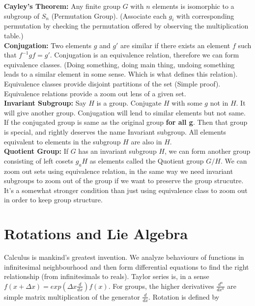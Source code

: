 \documentclass{report}
\begin{document}
\noindent\textbf{Cayley's Theorem:} Any finite group $G$ with $n$ elements is isomorphic to a subgroup of $S_n$ (Permutation Group). (Associate each $g_i$ with corresponding permutation by checking the permutation offered by observing the multiplication table.)\\

\noindent\textbf{Conjugation:} Two elements $g$ and $g'$ are similar if there exists an element $f$ such that $f^{-1}gf = g'$. Conjugation is an equivalence relation, therefore we can form equivalence classes. (Doing something, doing main thing, undoing something leads to a similar element in some sense. Which is what defines this relation). Equivalence classes provide disjoint partitions of the set (Simple proof). Equivalence relations provide a zoom out lens of a given set.\\

\noindent\textbf{Invariant Subgroup:} Say $H$ is a group. Conjugate $H$ with some $g$ not in $H$. It will give another group. Conjugation will lend to similar elements but not same. If the conjugated group is same as the original group \textbf{for all g}. Then that group is special, and rightly deserves the name Invariant subgroup. All elements equivalent to elements in the subgroup $H$ are also in $H$.\\

\noindent\textbf{Quotient Group:} If $G$ has an invariant subgroup $H$, we can form another group consisting of left cosets $g_aH$ as elements called the Quotient group $G/H$. We can zoom out sets using equivalence relation, in the same way we need invariant subgroups to zoom out of the group if we want to preserve the group strucutre. It's a somewhat stronger condition than just using equivalence class to zoom out in order to keep group structure. \\

\section{Rotations and Lie Algebra}

Calculus is mankind's greatest invention. We analyze behaviours of functions in infinitesimal neighbourhood and then form differential equations to find the right relationship (from infinitesimals to reals). Taylor series is, in a sense $f(x+\Delta x) = exp(\Delta x\frac{d}{dx})f(x)$. For groups, the higher derivatives $\frac{d^n}{dx^n}$ are simple matrix multiplication of the generator $\frac{d}{dx}$. Rotation is defined by
\end{document}
